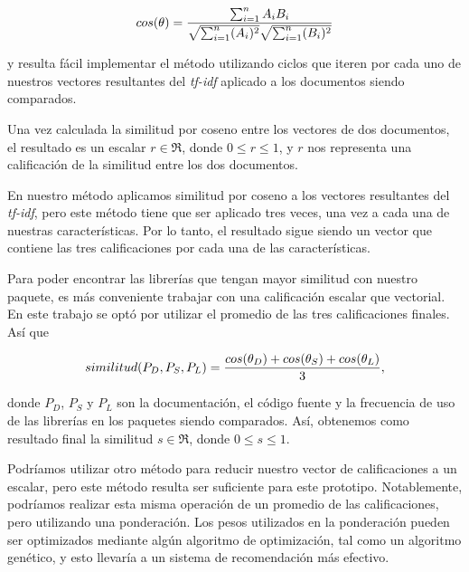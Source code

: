 \documentclass[times, 10pt,twocolumn, a4paper]{article}
\begin{document}
\begin{equation}
  cos(\theta ) = { {\sum_{i=1}^n A_i B_i} \over {\sqrt{\sum_{i=1}^n
        (A_i) ^ 2} \sqrt{\sum_{i=1}^n (B_i) ^ 2}}}
\end{equation}

y resulta f\'acil implementar el m\'etodo utilizando ciclos que iteren
por cada uno de nuestros vectores resultantes del \textit{tf-idf}
aplicado a los documentos siendo comparados.

Una vez calculada la similitud por coseno entre los vectores de dos
documentos, el resultado es un escalar \(r \in \Re\), donde \( 0 \leq
r \leq 1 \), y \(r\) nos representa una calificaci\'on de la similitud
entre los dos documentos.

\label{Promedio}

En nuestro m\'etodo aplicamos similitud por coseno a los vectores
resultantes del \textit{tf-idf}, pero este m\'etodo tiene que ser
aplicado tres veces, una vez a cada una de nuestras
caracter\'isticas. Por lo tanto, el resultado sigue siendo un vector
que contiene las tres calificaciones por cada una de las
caracter\'isticas.

Para poder encontrar las librer\'ias que tengan mayor similitud con
nuestro paquete, es m\'as conveniente trabajar con una calificaci\'on
escalar que vectorial. En este trabajo se opt\'o por utilizar el
promedio de las tres calificaciones finales. As\'i que

\begin{equation}
  {similitud(P_D, P_S, P_L)} = {{cos(\theta_D) + cos(\theta_S) +
      cos(\theta_L)} \over 3},
\end{equation}

donde \(P_D\), \(P_S\) y \(P_L\) son la documentaci\'on, el c\'odigo
fuente y la frecuencia de uso de las librer\'ias en los paquetes
siendo comparados. As\'i, obtenemos como resultado final la
similitud \(s \in \Re\), donde \( 0 \leq s \leq 1 \).

Podr\'iamos utilizar otro m\'etodo para reducir nuestro vector de
calificaciones a un escalar, pero este m\'etodo resulta ser suficiente
para este prototipo. Notablemente, podr\'iamos realizar esta misma
operaci\'on de un promedio de las calificaciones, pero utilizando una
ponderaci\'on. Los pesos utilizados en la ponderaci\'on pueden ser
optimizados mediante alg\'un algoritmo de optimizaci\'on, tal como un
algoritmo gen\'etico, y esto llevar\'ia a un sistema de
recomendaci\'on m\'as efectivo.
\end{document}
